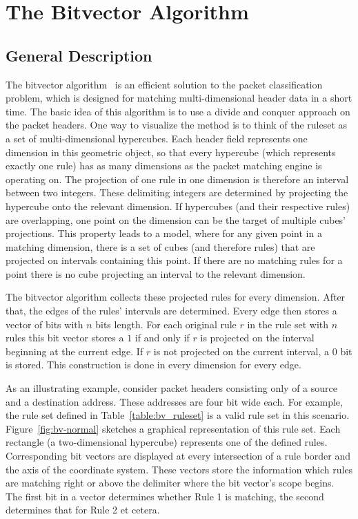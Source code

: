 \documentclass[a4paper,
		12pt,
		parskip=full,
		titlepage
		]{scrartcl}
\begin{document}
\section{The Bitvector Algorithm}
\subsection{General Description}
\label{sec:bv-general}
The bitvector algorithm~\cite{bv} is an efficient solution to the packet 
classification problem, which is designed for matching multi-dimensional header data in a short time.
The basic idea of this algorithm is to use a divide and conquer approach on the packet headers.
One way to visualize the method is to think of the ruleset as a set of multi-dimensional hypercubes.
Each header field represents one dimension in this geometric object, so 
that every hypercube (which represents exactly one rule) has as many dimensions as the packet matching engine is operating on.
The projection of one rule in one dimension is therefore an interval between two integers.
These delimiting integers are determined by projecting the hypercube onto the relevant dimension.
If hypercubes (and their respective rules) are overlapping, one point on the dimension can be the target of multiple cubes' projections. 
This property leads to a model, where for any given point in a matching 
dimension, there is a set of cubes (and therefore rules) that are projected on intervals containing this point.
If there are no matching rules for a point there is no cube projecting an interval to the relevant dimension.

The bitvector algorithm collects these projected rules for every dimension.
After that, the edges of the rules' intervals are determined.%
Every edge then stores a vector of bits with $n$ bits length.
For each original rule $r$ in the rule set with $n$ rules this bit vector 
stores a $1$ if and only if $r$ is projected on the interval beginning at the current edge.
If $r$ is not projected on the current interval, a $0$ bit is stored.
This construction is done in every dimension for every edge.

As an illustrating example, consider packet headers consisting only of a source and a destination address.
These addresses are four bit wide each.
For example, the rule set defined in Table~\ref{table:bv_ruleset} is a valid rule set in this scenario.
Figure~\ref{fig:bv-normal} sketches a graphical representation of this rule set.
Each rectangle (a two-dimensional hypercube) represents one of the defined rules.
Corresponding bit vectors are displayed at every intersection of a rule border and the axis of the coordinate system.
These vectors store the information which rules are matching right or above the delimiter where the bit vector's scope begins.
The first bit in a vector determines whether Rule 1 is matching, the second determines that for Rule 2 et cetera.
\end{document}
